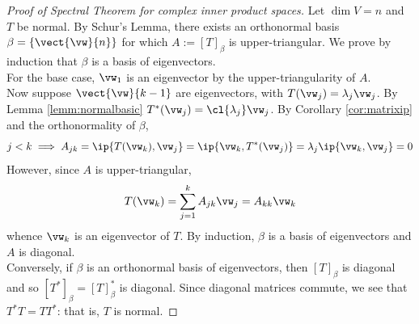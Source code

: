 \begin{proof}[Proof of Spectral Theorem for complex inner product spaces]
Let $\dim V=n$ and $T$ be normal. By Schur's Lemma, there exists an orthonormal basis $\beta=\{\vect{\vw}{n}\}$ for which $A:=[T]_\beta$ is upper-triangular. We prove by induction that $\beta$ is a basis of eigenvectors.\\[5pt]
For the base case, $\vw_1$ is an eigenvector by the upper-triangularity of $A$.\\[5pt]
Now suppose $\vect{\vw}{k-1}$ are eigenvectors, with $T(\vw_j)=\lambda_j\vw_j$. By Lemma \ref{lemm:normalbasic} $T^*(\vw_j)=\cl{\lambda_j}\vw_j$. By Corollary \ref{cor:matrixip} and the orthonormality of $\beta$,
\[j<k\implies A_{jk}=\ip{T(\vw_k),\vw_j}=\ip{\vw_k,T^*(\vw_j)} =\lambda_j\ip{\vw_k,\vw_j}=0\]
However, since $A$ is upper-triangular,
\[T(\vw_{k})=\sum_{j=1}^{k}A_{jk}\vw_j =A_{kk}\vw_k\]
whence $\vw_k$ is an eigenvector of $T$.
By induction, $\beta$ is a basis of eigenvectors and $A$ is diagonal.\\[5pt]
Conversely, if $\beta$ is an orthonormal basis of eigenvectors, then $[T]_\beta$ is diagonal and so $[T^*]_\beta=[T]_\beta^*$ is diagonal. Since diagonal matrices commute, we see that $T^*T=TT^*$: that is, $T$ is normal.
\end{proof}

 

